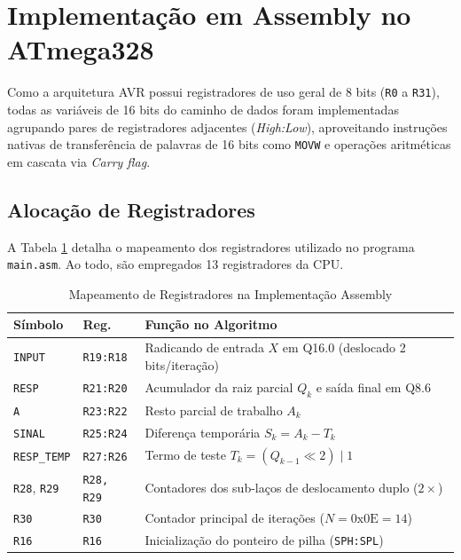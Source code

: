 \documentclass[conference]{IEEEtran}
\begin{document}
\section{Implementação em Assembly no ATmega328}
Como a arquitetura AVR possui registradores de uso geral de 8 bits (\texttt{R0} a \texttt{R31}), todas as variáveis de 16 bits do caminho de dados foram implementadas agrupando pares de registradores adjacentes (\textit{High:Low}), aproveitando instruções nativas de transferência de palavras de 16 bits como \texttt{MOVW} e operações aritméticas em cascata via \textit{Carry flag}.

\subsection{Alocação de Registradores}
A Tabela \ref{tab:registradores} detalha o mapeamento dos registradores utilizado no programa \texttt{main.asm}. Ao todo, são empregados 13 registradores da CPU.

\begin{table}[htbp]
	\caption{Mapeamento de Registradores na Implementação Assembly}
	\label{tab:registradores}
	\centering
	\footnotesize
	\setlength{\tabcolsep}{4pt}
	\begin{tabularx}{\columnwidth}{@{}llX@{}}
		\toprule
		\textbf{Símbolo}           & \textbf{Reg.}     & \textbf{Função no Algoritmo}                                  \\
		\midrule
		\texttt{INPUT}             & \texttt{R19:R18}  & Radicando de entrada $X$ em Q16.0 (deslocado 2 bits/iteração) \\
		\texttt{RESP}              & \texttt{R21:R20}  & Acumulador da raiz parcial $Q_k$ e saída final em Q8.6        \\
		\texttt{A}                 & \texttt{R23:R22}  & Resto parcial de trabalho $A_k$                               \\
		\texttt{SINAL}             & \texttt{R25:R24}  & Diferença temporária $S_k = A_k - T_k$                        \\
		\texttt{RESP\_TEMP}        & \texttt{R27:R26}  & Termo de teste $T_k = (Q_{k-1} \ll 2) \mid 1$                 \\
		\texttt{R28}, \texttt{R29} & \texttt{R28, R29} & Contadores dos sub-laços de deslocamento duplo ($2\times$)    \\
		\texttt{R30}               & \texttt{R30}      & Contador principal de iterações ($N = \text{0x0E} = 14$)      \\
		\texttt{R16}               & \texttt{R16}      & Inicialização do ponteiro de pilha (\texttt{SPH:SPL})         \\
		\bottomrule
	\end{tabularx}
\end{table}
\end{document}
